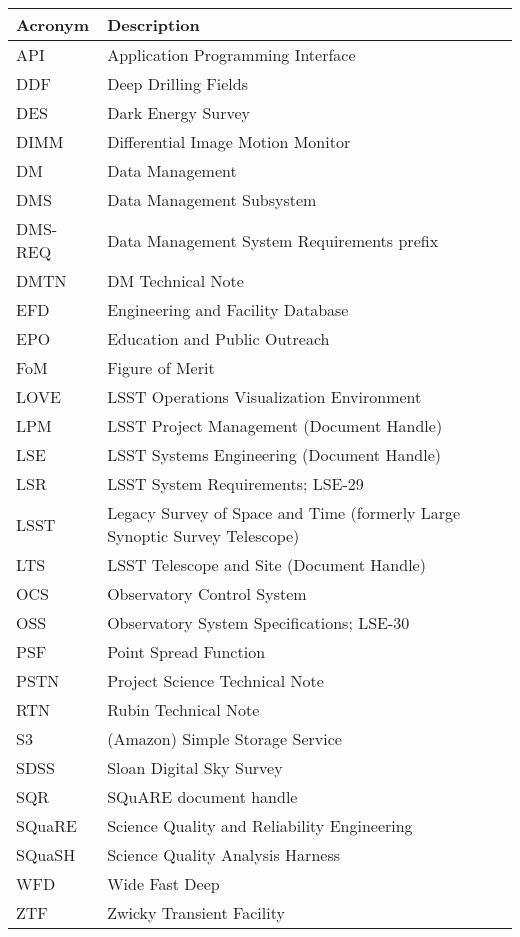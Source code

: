 \addtocounter{table}{-1}
\begin{longtable}{p{}p{}}\hline
\textbf{Acronym} & \textbf{Description}  \\\hline

API & Application Programming Interface \\\hline
DDF & Deep Drilling Fields \\\hline
DES & Dark Energy Survey \\\hline
DIMM & Differential Image Motion Monitor \\\hline
DM & Data Management \\\hline
DMS & Data Management Subsystem \\\hline
DMS-REQ & Data Management System Requirements prefix \\\hline
DMTN & DM Technical Note \\\hline
EFD & Engineering and Facility Database \\\hline
EPO & Education and Public Outreach \\\hline
FoM & Figure of Merit \\\hline
LOVE & LSST Operations Visualization Environment \\\hline
LPM & LSST Project Management (Document Handle) \\\hline
LSE & LSST Systems Engineering (Document Handle) \\\hline
LSR & LSST System Requirements; LSE-29 \\\hline
LSST & Legacy Survey of Space and Time (formerly Large Synoptic Survey Telescope) \\\hline
LTS & LSST Telescope and Site  (Document Handle) \\\hline
OCS & Observatory Control System \\\hline
OSS & Observatory System Specifications; LSE-30 \\\hline
PSF & Point Spread Function \\\hline
PSTN & Project Science Technical Note \\\hline
RTN & Rubin Technical Note \\\hline
S3 & (Amazon) Simple Storage Service  \\\hline
SDSS & Sloan Digital Sky Survey \\\hline
SQR & SQuARE document handle \\\hline
SQuaRE & Science Quality and Reliability Engineering \\\hline
SQuaSH & Science Quality Analysis Harness \\\hline
WFD & Wide Fast Deep \\\hline
ZTF & Zwicky Transient Facility \\\hline
\end{longtable}
